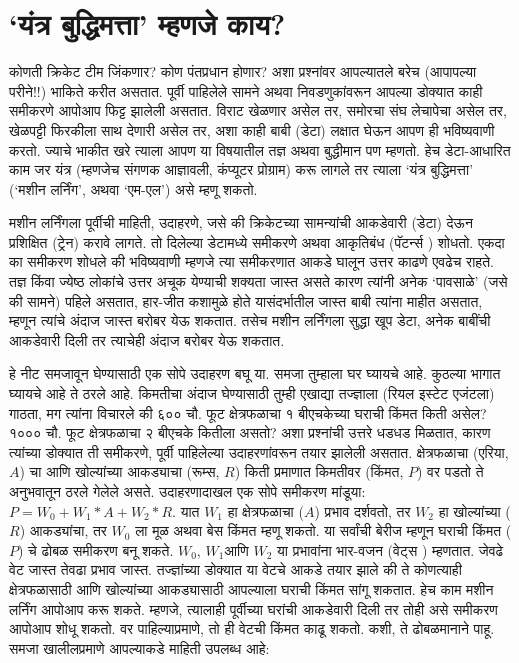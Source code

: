 \chapter{`यंत्र बुद्धिमत्ता' म्हणजे काय?}
कोणती क्रिकेट टीम जिंकणार? कोण पंतप्रधान होणार?  अशा प्रश्नांवर आपल्यातले बरेच (आपापल्या परीने!!) भाकिते करीत असतात. पूर्वी पाहिलेले सामने अथवा निवडणुकांवरून आपल्या डोक्यात काही समीकरणे आपोआप फिट्ट झालेली असतात. विराट खेळणार असेल तर, समोरचा संघ लेचापेचा असेल तर, खेळपट्टी फिरकीला साथ देणारी असेल तर, अशा काही बाबी (डेटा) लक्षात घेऊन आपण ही भविष्यवाणी करतो. ज्याचे भाकीत खरे त्याला आपण या विषयातील तज्ञ अथवा बुद्धीमान पण म्हणतो. हेच डेटा-आधारित  काम जर यंत्र (म्हणजेच संगणक आज्ञावली, कंप्यूटर प्रोग्राम) करू लागले तर त्याला `यंत्र बुद्धिमत्ता' (`मशीन लर्निंग', अथवा `एम-एल') असे म्हणू शकतो.

मशीन लर्निंगला पूर्वीची माहिती, उदाहरणे, जसे की क्रिकेटच्या सामन्यांची आकडेवारी (डेटा) देऊन प्रशिक्षित (ट्रेन) करावे लागते. तो दिलेल्या डेटामध्ये समीकरणे अथवा आकृतिबंध (पॅटर्न्स ) शोधतो. एकदा का समीकरण शोधले की भविष्यवाणी म्हणजे त्या समीकरणात आकडे घालून उत्तर काढणे एवढेच राहते. तज्ञ किंवा ज्येष्ठ लोकांचे उत्तर अचूक येण्याची शक्यता जास्त असते कारण त्यांनी अनेक `पावसाळे' (जसे की सामने) पहिले असतात, हार-जीत कशामुळे होते यासंदर्भातील जास्त बाबी त्यांना माहीत असतात, म्हणून त्यांचे अंदाज जास्त बरोबर येऊ शकतात. तसेच मशीन लर्निंगला सुद्धा खूप डेटा, अनेक बाबींची आकडेवारी दिली तर त्याचेही अंदाज बरोबर येऊ शकतात.

हे नीट समजावून घेण्यासाठी एक सोपे उदाहरण बघू या. समजा तुम्हाला घर घ्यायचे आहे. कुठल्या भागात घ्यायचे आहे ते ठरले आहे. किमतीचा अंदाज घेण्यासाठी तुम्ही एखाद्या तज्ज्ञाला (रियल इस्टेट एजंटला) गाठता, मग त्यांना विचारले की ६०० चौ. फूट क्षेत्रफळाचा १  बीएचकेच्या घराची किंमत किती असेल? १००० चौ. फूट क्षेत्रफळाचा २ बीएचके कितीला असतो? अशा प्रश्नांची उत्तरे धडधड मिळतात, कारण त्यांच्या डोक्यात ती समीकरणे, पूर्वी पाहिलेल्या उदाहरणांवरून तयार झालेली असतात. क्षेत्रफळाचा (एरिया, $A$) चा आणि खोल्यांच्या आकड्याचा (रूम्स, $R$) किती प्रमाणात किमतीवर (किंमत, $P$) वर पडतो ते अनुभवातून ठरले गेलेले असते. उदाहरणादाखल एक सोपे समीकरण मांडूया: $P = W_0 + W_1 * A + W_2 * R$. यात $W_1$ हा क्षेत्रफळाचा ($A$) प्रभाव दर्शवतो, तर $W_2$ हा खोल्यांच्या ($R$) आकड्यांचा, तर $W_0$ ला मूळ अथवा बेस किंमत म्हणू शकतो. या सर्वांची बेरीज म्हणून घराची किंमत ($P$) चे ढोबळ समीकरण बनू शकते. $W_0$, $W_1 $आणि $W_2$ या प्रभावांना  भार-वजन  (वेट्स ) म्हणतात. जेवढे वेट जास्त तेवढा प्रभाव जास्त. तज्ज्ञांच्या डोक्यात या वेटचे आकडे तयार झाले की ते कोणत्याही क्षेत्रफळासाठी आणि खोल्यांच्या आकड्यासाठी आपल्याला घराची किंमत सांगू शकतात. हेच काम मशीन लर्निंग आपोआप करू शकते. म्हणजे, त्यालाही पूर्वीच्या घरांची आकडेवारी दिली तर तोही असे समीकरण आपोआप शोधू शकतो. वर पाहिल्याप्रमाणे, तो ही वेटची किंमत काढू शकतो. कशी, ते ढोबळमानाने पाहू. समजा खालीलप्रमाणे आपल्याकडे माहिती उपलब्ध आहे:

